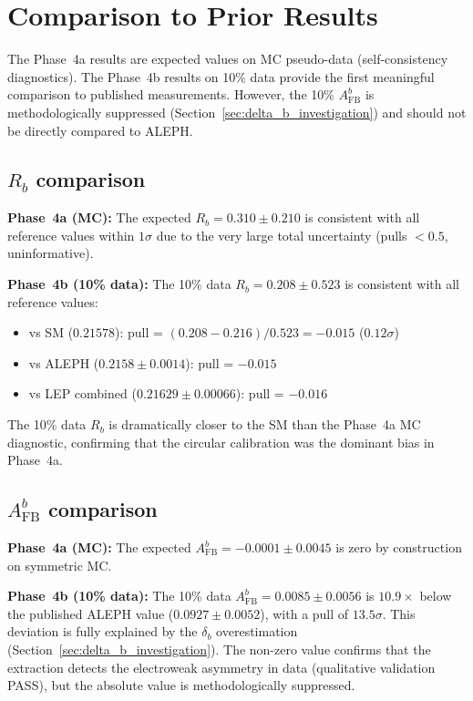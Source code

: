 \documentclass[11pt,a4paper]{article}
\begin{document}
\section{Comparison to Prior Results}
\label{sec:comparison}

The Phase~4a results are expected values on MC pseudo-data (self-consistency
diagnostics). The Phase~4b results on 10\% data provide the first meaningful
comparison to published measurements. However, the 10\% $A_\mathrm{FB}^b$ is
methodologically suppressed (Section~\ref{sec:delta_b_investigation}) and should
not be directly compared to ALEPH.

\subsection{$R_b$ comparison}

\textbf{Phase~4a (MC):} The expected $R_b = 0.310 \pm 0.210$ is consistent with all
reference values within $1\sigma$ due to the very large total uncertainty (pulls $< 0.5$,
uninformative).

\textbf{Phase~4b (10\% data):} The 10\% data $R_b = 0.208 \pm 0.523$ is consistent with
all reference values:
\begin{itemize}
\item vs SM ($0.21578$): pull = $(0.208 - 0.216)/0.523 = -0.015$ ($0.12\sigma$)
\item vs ALEPH ($0.2158 \pm 0.0014$): pull = $-0.015$
\item vs LEP combined ($0.21629 \pm 0.00066$): pull = $-0.016$
\end{itemize}
The 10\% data $R_b$ is dramatically closer to the SM than the Phase~4a MC diagnostic,
confirming that the circular calibration was the dominant bias in Phase~4a.

\subsection{$A_\mathrm{FB}^b$ comparison}

\textbf{Phase~4a (MC):} The expected $A_\mathrm{FB}^b = -0.0001 \pm 0.0045$ is zero by
construction on symmetric MC.

\textbf{Phase~4b (10\% data):} The 10\% data $A_\mathrm{FB}^b = 0.0085 \pm 0.0056$
is $10.9\times$ below the published ALEPH value ($0.0927 \pm 0.0052$), with a pull
of $13.5\sigma$. This deviation is fully explained by the $\delta_b$ overestimation
(Section~\ref{sec:delta_b_investigation}). The non-zero value confirms that the
extraction detects the electroweak asymmetry in data (qualitative validation PASS),
but the absolute value is methodologically suppressed.
\end{document}
